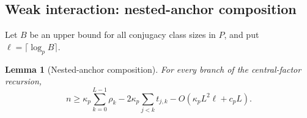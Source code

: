 \documentclass[11pt]{article}
\newtheorem{lemma}[theorem]{Lemma}
\theoremstyle{definition}
\theoremstyle{remark}
\begin{document}
\subsection{Weak interaction: nested-anchor composition}

Let $B$ be an upper bound for all conjugacy class sizes in $P$, and put $\ell=\lceil\log_pB\rceil$.

\begin{lemma}[Nested-anchor composition]\label{lem:nested}
For every branch of the central-factor recursion,
\begin{equation}\label{eq:nested}
n\ge \kappa_p\sum_{k=0}^{L-1}\rho_k-2\kappa_p\sum_{j<k}t_{j,k}-O\!\left(\kappa_pL^2\ell+c_pL\right).
\end{equation}
\end{lemma}
\end{document}
